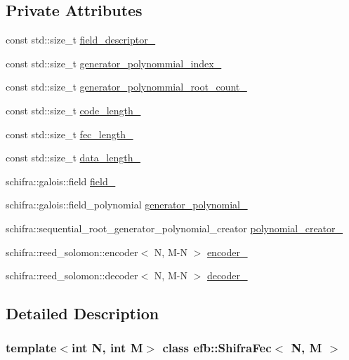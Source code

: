 \subsection*{Private Attributes}
\begin{DoxyCompactItemize}
\item 
const std::size\_\-t \hyperlink{classefb_1_1ShifraFec_aab1a6051362d9a8b9dc1bf66162743ba}{field\_\-descriptor\_\-}
\item 
const std::size\_\-t \hyperlink{classefb_1_1ShifraFec_a0151caad93dcee8fd76042845c7761d1}{generator\_\-polynommial\_\-index\_\-}
\item 
const std::size\_\-t \hyperlink{classefb_1_1ShifraFec_a187b4bde8c8d1626ee351ad9d8a10efb}{generator\_\-polynommial\_\-root\_\-count\_\-}
\item 
const std::size\_\-t \hyperlink{classefb_1_1ShifraFec_aec880d94a65f32e64736d21ecc62caee}{code\_\-length\_\-}
\item 
const std::size\_\-t \hyperlink{classefb_1_1ShifraFec_a560cb28c8a918c24356967a3c35604ad}{fec\_\-length\_\-}
\item 
const std::size\_\-t \hyperlink{classefb_1_1ShifraFec_a780eb0b73c725bab3470002b4746d07e}{data\_\-length\_\-}
\item 
schifra::galois::field \hyperlink{classefb_1_1ShifraFec_a770e111002e7a8b19041c4f3a972b2c1}{field\_\-}
\item 
schifra::galois::field\_\-polynomial \hyperlink{classefb_1_1ShifraFec_a80fe940d7742c12811d27cbb50d605dc}{generator\_\-polynomial\_\-}
\item 
schifra::sequential\_\-root\_\-generator\_\-polynomial\_\-creator \hyperlink{classefb_1_1ShifraFec_a6dd291fa5e301f1d88eba72e486c22d3}{polynomial\_\-creator\_\-}
\item 
schifra::reed\_\-solomon::encoder$<$ N, M-\/N $>$ \hyperlink{classefb_1_1ShifraFec_a48add19c7145ddef42b214f772508c0f}{encoder\_\-}
\item 
schifra::reed\_\-solomon::decoder$<$ N, M-\/N $>$ \hyperlink{classefb_1_1ShifraFec_acddab8a0f72a511d8b03ffecfe77735a}{decoder\_\-}
\end{DoxyCompactItemize}


\subsection{Detailed Description}
\subsubsection*{template$<$int N, int M$>$ class efb::ShifraFec$<$ N, M $>$}

